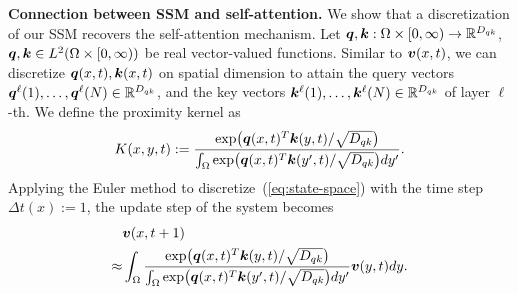 \textbf{Connection between SSM and self-attention.} We show that a discretization of our SSM recovers the self-attention mechanism. Let ${\bm q}, {\bm k}:\Omega \times [0, \infty) \rightarrow {\mathbb{R}}^{D_{qk}}$, ${\bm q},{\bm k} \in L^{2}(\Omega \times [0, \infty))$ be real vector-valued functions. Similar to ${\bm v}(x, t)$, we can discretize ${\bm q}(x, t),{\bm k}(x, t)$ on spatial dimension to attain the query vectors ${\bm q}^{\ell}(1), \dots, {\bm q}^{\ell}(N) \in {\mathbb{R}}^{D_{qk}}$, and the key vectors ${\bm k}^{\ell}(1), \dots, {\bm k}^{\ell}(N) \in {\mathbb{R}}^{D_{qk}}$ of layer $\ell$-th. We define the proximity kernel as
\[
    K(x,y,t):= \frac{\exp\bigl({\bm q}(x, t)^{T}{\bm k}(y, t)/\sqrt{D_{qk}}\bigl)}{\int_{\Omega}\exp\bigl({\bm q}(x, t)^{T}{\bm k}(y', t)/\sqrt{D_{qk}}\bigl)dy'}.
\]
Applying the Euler method to discretize~(\ref{eq:state-space}) with the time step $\Delta t(x):= 1$, the update step of the system becomes
\begin{equation}
   \begin{aligned}
\label{eqn:sym-attn-cont}
&\bm{v}(x, t + 1) \\
\approx
&\displaystyle \int_{\Omega}\frac{\exp\bigl({\bm q}(x, t)^{T}{\bm k}(y, t)/\sqrt{D_{qk}}\bigl)}{\int_{\Omega}\exp\bigl({\bm q}(x, t)^{T}{\bm k}(y', t)/\sqrt{D_{qk}}\bigl)dy'} {\bm v}(y, t)dy.
\end{aligned} 
\end{equation}

